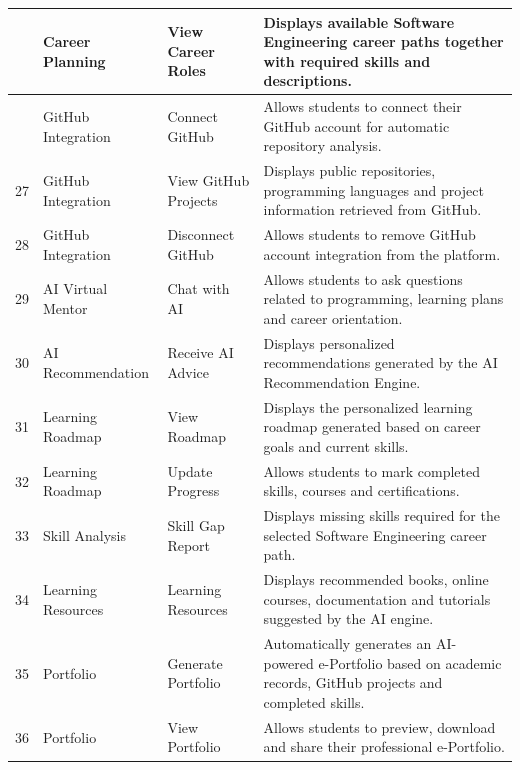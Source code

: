 \begin{longtable}{|>{\centering\arraybackslash}p{0.8cm}|p{3.2cm}|p{3.5cm}|p{8cm}|}
25 &
Career Planning &
View Career Roles &
Displays available Software Engineering career paths together with required skills and descriptions.
\\
\hline

26 &
GitHub Integration &
Connect GitHub &
Allows students to connect their GitHub account for automatic repository analysis.
\\
\hline

27 &
GitHub Integration &
View GitHub Projects &
Displays public repositories, programming languages and project information retrieved from GitHub.
\\
\hline

28 &
GitHub Integration &
Disconnect GitHub &
Allows students to remove GitHub account integration from the platform.
\\
\hline

29 &
AI Virtual Mentor &
Chat with AI &
Allows students to ask questions related to programming, learning plans and career orientation.
\\
\hline

30 &
AI Recommendation &
Receive AI Advice &
Displays personalized recommendations generated by the AI Recommendation Engine.
\\
\hline

31 &
Learning Roadmap &
View Roadmap &
Displays the personalized learning roadmap generated based on career goals and current skills.
\\
\hline

32 &
Learning Roadmap &
Update Progress &
Allows students to mark completed skills, courses and certifications.
\\
\hline

33 &
Skill Analysis &
Skill Gap Report &
Displays missing skills required for the selected Software Engineering career path.
\\
\hline

34 &
Learning Resources &
Learning Resources &
Displays recommended books, online courses, documentation and tutorials suggested by the AI engine.
\\
\hline

35 &
Portfolio &
Generate Portfolio &
Automatically generates an AI-powered e-Portfolio based on academic records, GitHub projects and completed skills.
\\
\hline

36 &
Portfolio &
View Portfolio &
Allows students to preview, download and share their professional e-Portfolio.
\\
\hline


\end{longtable}
